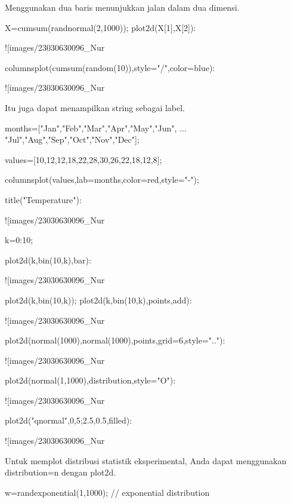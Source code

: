 \documentclass{article}
\begin{document}
Menggunakan dua baris menunjukkan jalan dalam dua dimensi.


\>X=cumsum(randnormal(2,1000)); plot2d(X[1],X[2]):


![images/23030630096_Nur%

\>columnsplot(cumsum(random(10)),style="/",color=blue):


![images/23030630096_Nur%

Itu juga dapat menampilkan string sebagai label.


\>months=["Jan","Feb","Mar","Apr","May","Jun", ...  
\>     "Jul","Aug","Sep","Oct","Nov","Dec"];

\>values=[10,12,12,18,22,28,30,26,22,18,12,8];

\>columnsplot(values,lab=months,color=red,style="-");

\>title("Temperature"):


![images/23030630096_Nur%

\>k=0:10;

\>plot2d(k,bin(10,k),\>bar):


![images/23030630096_Nur%

\>plot2d(k,bin(10,k)); plot2d(k,bin(10,k),\>points,\>add):


![images/23030630096_Nur%

\>plot2d(normal(1000),normal(1000),\>points,grid=6,style=".."):


![images/23030630096_Nur%

\>plot2d(normal(1,1000),\>distribution,style="O"):


![images/23030630096_Nur%

\>plot2d("qnormal",0,5;2.5,0.5,\>filled):


![images/23030630096_Nur%

Untuk memplot distribusi statistik eksperimental, Anda dapat
menggunakan distribution=n dengan plot2d.


\>w=randexponential(1,1000); // exponential distribution
\end{document}

